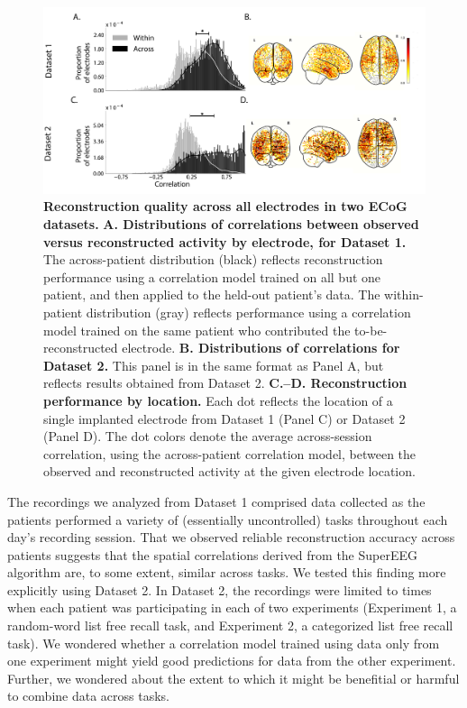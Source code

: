 \documentclass[11pt]{article}
\begin{document}
\begin{figure}
  \centering
  \includegraphics[width=\textwidth]{figs/corrmap}
  \caption{\textbf{Reconstruction quality across all electrodes in two
      ECoG datasets.}  \textbf{A. Distributions of correlations
      between observed versus reconstructed activity by electrode, for
      Dataset 1.}  The across-patient distribution (black) reflects
    reconstruction performance using a correlation model trained on
    all but one patient, and then applied to the held-out patient's
    data.  The within-patient distribution (gray) reflects performance using
    a correlation model trained on the same patient who contributed
    the to-be-reconstructed electrode.  \textbf{B. Distributions of
      correlations for Dataset 2.}  This panel is in the same format
    as Panel A, but reflects results obtained from Dataset 2.
    \textbf{C.--D.  Reconstruction performance by location.} Each dot
    reflects the location of a single implanted electrode from Dataset
    1 (Panel C) or Dataset 2 (Panel D).  The dot colors denote the
    average across-session correlation, using the across-patient
    correlation model, between the observed and
    reconstructed activity at the given electrode location.}
  \label{fig:corrmap}
\end{figure}

The recordings we analyzed from Dataset 1 comprised data collected as
the patients performed a variety of (essentially uncontrolled) tasks
throughout each day's recording session.  That we observed reliable
reconstruction accuracy across patients suggests that the spatial
correlations derived from the SuperEEG algorithm are, to some extent,
similar across tasks.  We tested this finding more explicitly using
Dataset 2.  In Dataset 2, the recordings were limited to times when
each patient was participating in each of two experiments (Experiment
1, a random-word list free recall task, and Experiment 2, a
categorized list free recall task).  We wondered whether a correlation
model trained using data only from one experiment might yield good
predictions for data from the other experiment.  Further, we wondered
about the extent to which it might be benefitial or harmful to combine
data across tasks.
\end{document}
